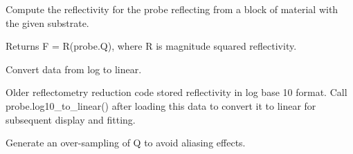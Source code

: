 \documentclass[letterpaper,10pt,english]{sphinxmanual}
\begin{document}
\begin{fulllineitems}
\begin{fulllineitems}
\end{fulllineitems}


\begin{fulllineitems}
\label{api/probe:refl1d.probe.Probe.data}
\end{fulllineitems}


\begin{fulllineitems}
\label{api/probe:refl1d.probe.Probe.fresnel}
Compute the reflectivity for the probe reflecting from a block of
material with the given substrate.

Returns F = R(probe.Q), where R is magnitude squared reflectivity.

\end{fulllineitems}


\begin{fulllineitems}
\label{api/probe:refl1d.probe.Probe.label}
\end{fulllineitems}


\begin{fulllineitems}
\label{api/probe:refl1d.probe.Probe.log10_to_linear}
Convert data from log to linear.

Older reflectometry reduction code stored reflectivity in log base 10
format.  Call probe.log10\_to\_linear() after loading this data to
convert it to linear for subsequent display and fitting.

\end{fulllineitems}


\begin{fulllineitems}
\label{api/probe:refl1d.probe.Probe.name}
\end{fulllineitems}


\begin{fulllineitems}
\label{api/probe:refl1d.probe.Probe.oversample}
Generate an over-sampling of Q to avoid aliasing effects.


\end{fulllineitems}
\end{fulllineitems}
\end{document}
